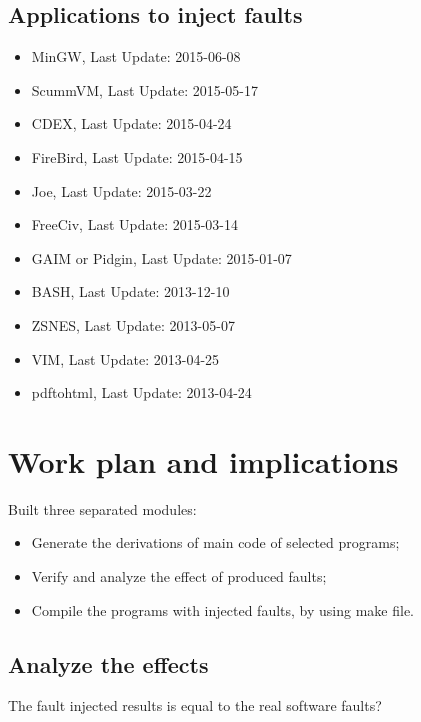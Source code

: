 \clearpage
\subsection{Applications to inject faults}


\begin{itemize}
	\item MinGW, Last Update: 2015-06-08
	\item ScummVM, Last Update: 2015-05-17
	\item CDEX, Last Update: 2015-04-24
	\item FireBird, Last Update: 2015-04-15
	\item Joe, Last Update: 2015-03-22
	\item FreeCiv, Last Update: 2015-03-14
	\item GAIM or Pidgin, Last Update: 2015-01-07
	\item BASH, Last Update: 2013-12-10
	\item ZSNES, Last Update: 2013-05-07
	\item VIM, Last Update: 2013-04-25
	\item pdftohtml, Last Update: 2013-04-24
\end{itemize}

\newpage
\section{Work plan and implications}

Built three separated modules:

\begin{itemize}
	\item Generate the derivations of main code of selected programs;
	\item Verify and analyze the effect of produced faults;
	\item Compile the programs with injected faults, by using make file.
\end{itemize}

\subsection{Analyze the effects}

The fault injected results is equal to the real software faults?




